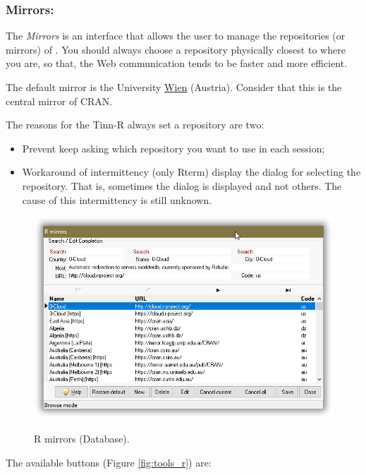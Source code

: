 \subsubsection{Mirrors:}

The \textit{Mirrors} is an interface that allows the user to manage the repositories (or mirrors) of \RR{}.
You should always choose a repository physically closest to where you are,
so that, the Web communication tends to be faster and more efficient.

The default mirror is the University \href{http://cran.at.r-project.org/}{Wien}
(Austria). Consider that this is the central mirror of CRAN.

The reasons for the Tinn-R always set a repository are two:
\begin {itemize}
   \item Prevent \RR{} keep asking which repository you want to use in each session;
   \item Workaround of intermittency (only Rterm) display the dialog for selecting the repository.
    That is, sometimes the dialog is displayed and not others. The cause of this intermittency is still unknown.
\end {itemize}

\begin{figure}[H]
  \includegraphics[scale=0.35]{./res/mirrors_dlg.png}\\
  \caption{R mirrors (Database).}
  \label{fig:mirrors_dlg_2}
\end{figure}

The available buttons
(Figure \ref{fig:tools_r})
are:

